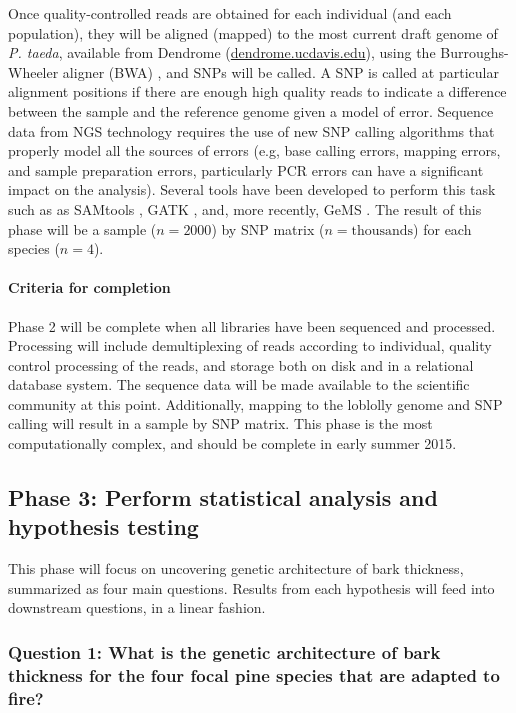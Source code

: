 Once quality-controlled reads are obtained for each individual (and each population), they will be aligned (mapped) to the 
most current draft genome of \emph{P. taeda}, available from Dendrome (\url{dendrome.ucdavis.edu}), using the 
Burroughs-Wheeler aligner (BWA) \citep{Li:2009fi}, and SNPs will be called.  A SNP is called at particular alignment positions 
if there are enough high quality reads to indicate a difference between the sample and the reference genome given a model of error. 
Sequence data from NGS technology requires the use of new SNP calling algorithms that properly model all the sources of errors 
(e.g, base calling errors, mapping errors, and sample preparation errors, particularly PCR errors can have a significant impact on the 
analysis). Several tools have been developed to perform this task such as as SAMtools \citep{Li:2009ka}, GATK \citep{McKenna:2010bv}, 
and, more recently, GeMS \citep{You:2012iy}.   The result of this phase will be a sample ($n = 2000$) by SNP 
matrix ($n = \text{thousands}$) for each species ($n = 4$).  

\paragraph{Criteria for completion} Phase 2 will be complete when all libraries have been sequenced and processed.  Processing 
will include demultiplexing of reads according to individual, quality control processing of the reads, and storage both on disk and 
in a relational database system.  The sequence data will be made available to the scientific community at this point.  Additionally, 
mapping to the loblolly genome and SNP calling will result in a sample by SNP matrix.  This phase is the most computationally 
complex, and should be complete in early summer 2015.  

\subsection*{Phase 3: Perform statistical analysis and hypothesis testing}

This phase will focus on uncovering genetic architecture of bark thickness, summarized as four main questions.  Results 
from each hypothesis will feed into downstream questions, in a linear fashion.

\subsubsection*{Question 1: What is the genetic architecture of bark thickness for the four focal pine species that 
are adapted to fire?}

